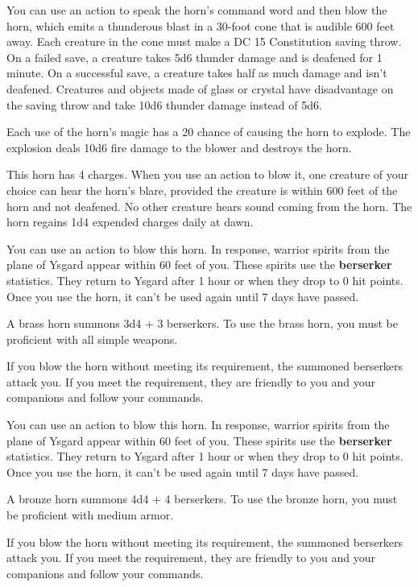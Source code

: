 \documentclass[10pt,a4paper,twoside,bg=print,twocolumn,openany,nodeprecatedcode]{dndbook}
\begin{document}
You can use an action to speak the horn's command word and then blow the horn, which emits a thunderous blast in a 30-foot cone that is audible 600 feet away. Each creature in the cone must make a DC 15 Constitution saving throw. On a failed save, a creature takes 5d6 thunder damage and is deafened for 1 minute. On a successful save, a creature takes half as much damage and isn't deafened. Creatures and objects made of glass or crystal have disadvantage on the saving throw and take 10d6 thunder damage instead of 5d6.

Each use of the horn's magic has a 20 chance of causing the horn to explode. The explosion deals 10d6 fire damage to the blower and destroys the horn.

This horn has 4 charges. When you use an action to blow it, one creature of your choice can hear the horn's blare, provided the creature is within 600 feet of the horn and not deafened. No other creature hears sound coming from the horn. The horn regains 1d4 expended charges daily at dawn.

You can use an action to blow this horn. In response, warrior spirits from the plane of Ysgard appear within 60 feet of you. These spirits use the \textbf{berserker} statistics. They return to Ysgard after 1 hour or when they drop to 0 hit points. Once you use the horn, it can't be used again until 7 days have passed.

A brass horn summons 3d4 + 3 berserkers. To use the brass horn, you must be proficient with all simple weapons.

If you blow the horn without meeting its requirement, the summoned berserkers attack you. If you meet the requirement, they are friendly to you and your companions and follow your commands.

You can use an action to blow this horn. In response, warrior spirits from the plane of Ysgard appear within 60 feet of you. These spirits use the \textbf{berserker} statistics. They return to Ysgard after 1 hour or when they drop to 0 hit points. Once you use the horn, it can't be used again until 7 days have passed.

A bronze horn summons 4d4 + 4 berserkers. To use the bronze horn, you must be proficient with medium armor.

If you blow the horn without meeting its requirement, the summoned berserkers attack you. If you meet the requirement, they are friendly to you and your companions and follow your commands.
\end{document}
